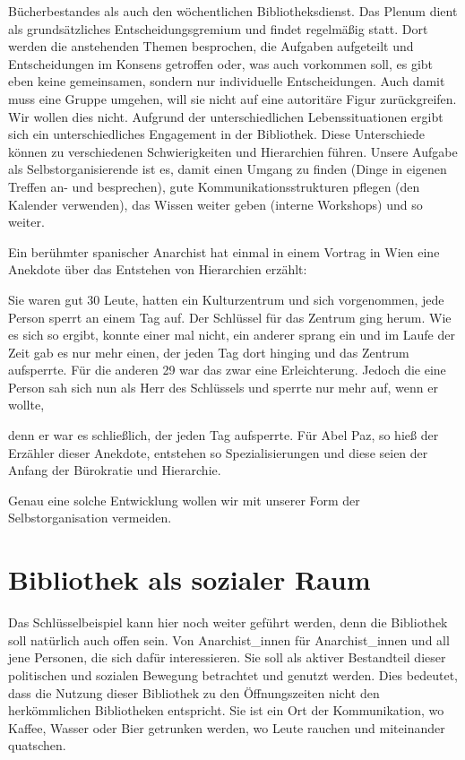 \documentclass[a4paper,
fontsize=11pt,
oneside,
numbers=noperiodatend,
parskip=half-,
bibliography=totoc,
final
]{scrartcl}
\begin{document}
Bücherbestandes als auch den wöchentlichen Bibliotheksdienst. Das Plenum
dient als grundsätzliches Entscheidungsgremium und findet regelmäßig
statt. Dort werden die anstehenden Themen besprochen, die Aufgaben
aufgeteilt und Entscheidungen im Konsens getroffen oder, was auch
vorkommen soll, es gibt eben keine gemeinsamen, sondern nur individuelle
Entscheidungen. Auch damit muss eine Gruppe umgehen, will sie nicht auf
eine autoritäre Figur zurückgreifen. Wir wollen dies nicht. Aufgrund der
unterschiedlichen Lebenssituationen ergibt sich ein unterschiedliches
Engagement in der Bibliothek. Diese Unterschiede können zu verschiedenen
Schwierigkeiten und Hierarchien führen. Unsere Aufgabe als
Selbstorganisierende ist es, damit einen Umgang zu finden (Dinge in
eigenen Treffen an- und besprechen), gute Kommunikationsstrukturen
pflegen (den Kalender verwenden), das Wissen weiter geben (interne
Workshops) und so weiter.

Ein berühmter spanischer Anarchist hat einmal in einem Vortrag in Wien
eine Anekdote über das Entstehen von Hierarchien erzählt:

Sie waren gut 30 Leute, hatten ein Kulturzentrum und sich vorgenommen,
jede Person sperrt an einem Tag auf. Der Schlüssel für das Zentrum ging
herum. Wie es sich so ergibt, konnte einer mal nicht, ein anderer sprang
ein und im Laufe der Zeit gab es nur mehr einen, der jeden Tag dort
hinging und das Zentrum aufsperrte. Für die anderen 29 war das zwar eine
Erleichterung. Jedoch die eine Person sah sich nun als Herr des
Schlüssels und sperrte nur mehr auf, wenn er wollte,

denn er war es schließlich, der jeden Tag aufsperrte. Für Abel Paz, so
hieß der Erzähler dieser Anekdote, entstehen so Spezialisierungen und
diese seien der Anfang der Bürokratie und Hierarchie.

Genau eine solche Entwicklung wollen wir mit unserer Form der
Selbstorganisation vermeiden.

\section*{Bibliothek als sozialer
Raum}\label{bibliothek-als-sozialer-raum}

Das Schlüsselbeispiel kann hier noch weiter geführt werden, denn die
Bibliothek soll natürlich auch offen sein. Von Anarchist\_innen für
Anarchist\_innen und all jene Personen, die sich dafür interessieren.
Sie soll als aktiver Bestandteil dieser politischen und sozialen
Bewegung betrachtet und genutzt werden. Dies bedeutet, dass die Nutzung
dieser Bibliothek zu den Öffnungszeiten nicht den herkömmlichen
Bibliotheken entspricht. Sie ist ein Ort der Kommunikation, wo Kaffee,
Wasser oder Bier getrunken werden, wo Leute rauchen und miteinander
quatschen.
\end{document}

